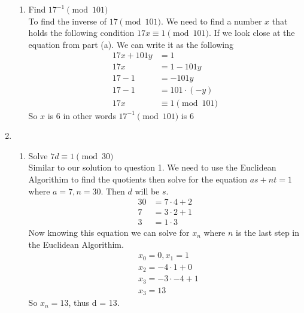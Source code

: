 \documentclass[12pt]{article}
\begin{document}
\begin{enumerate}
\begin{enumerate}
              \item Find $17^{-1} \pmod{101}$\\
                    To find the inverse of $17 \pmod{101}$. We need to find a number $x$ that holds the following condition $17x \equiv 1 \pmod{101}$. If we look close at the equation from part (a). We can write it as the following\begin{align*}
                        17x +101y & =1                  \\
                        17x       & = 1-101y            \\
                        17-1      & = -101y             \\
                        17 - 1    & = 101\cdot(-y)      \\
                        17x       & \equiv 1 \pmod{101}
                    \end{align*}
                    So $x$ is 6 in other words $17^{-1} \pmod{101}$ is 6
          \end{enumerate}
          \newpage
    \item \begin{enumerate}
              \item Solve $7d \equiv 1 \pmod{30}$\\
                    Similar to our solution to question 1. We need to use the Euclidean Algorithim to find the quotients then solve for the equation $as+nt =1$ where $a = 7, n=30$. Then $d$ will be $s$.
                    \begin{align*}
                        30 & = 7 \cdot 4 +2 \\
                        7  & = 3 \cdot 2 +1 \\
                        3  & =1 \cdot 3
                    \end{align*}
                    Now knowing this equation we can solve for $x_n$ where $n$ is the last step in the Euclidean Algorithim.
                    \begin{align*}
                         & x_0 = 0, x_1 =1       \\
                         & x_2 = -4 \cdot 1 + 0  \\
                         & x_3 = -3 \cdot -4 + 1 \\
                         & x_3 = 13
                    \end{align*}
                    So $x_n = 13$, thus d = 13.


\end{enumerate}
\end{enumerate}
\end{document}
